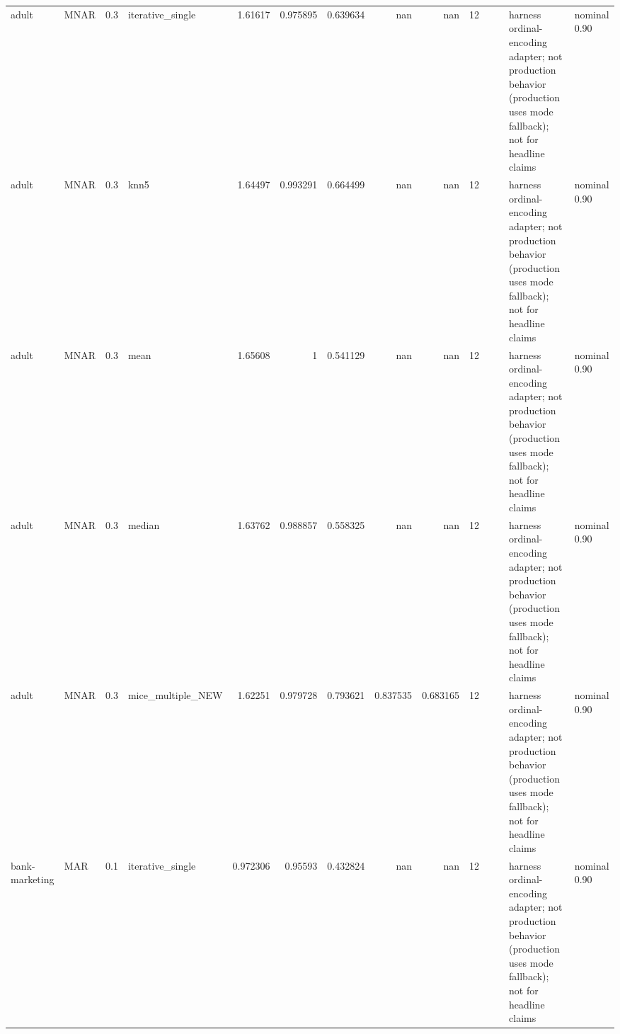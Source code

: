 \begin{table}[ht]
\begin{tabular}{llrlrrrrrrllll}
 adult                & MNAR        &         0.3 & iterative\_single  &       1.61617  &             0.975895 &                 0.639634 &                     nan        &                       nan        &        12 &                    &                                         & harness ordinal-encoding adapter; not production behavior (production uses mode fallback); not for headline claims & nominal 0.90              \\
 adult                & MNAR        &         0.3 & knn5              &       1.64497  &             0.993291 &                 0.664499 &                     nan        &                       nan        &        12 &                    &                                         & harness ordinal-encoding adapter; not production behavior (production uses mode fallback); not for headline claims & nominal 0.90              \\
 adult                & MNAR        &         0.3 & mean              &       1.65608  &             1        &                 0.541129 &                     nan        &                       nan        &        12 &                    &                                         & harness ordinal-encoding adapter; not production behavior (production uses mode fallback); not for headline claims & nominal 0.90              \\
 adult                & MNAR        &         0.3 & median            &       1.63762  &             0.988857 &                 0.558325 &                     nan        &                       nan        &        12 &                    &                                         & harness ordinal-encoding adapter; not production behavior (production uses mode fallback); not for headline claims & nominal 0.90              \\
 adult                & MNAR        &         0.3 & mice\_multiple\_NEW &       1.62251  &             0.979728 &                 0.793621 &                       0.837535 &                         0.683165 &        12 &                    &                                         & harness ordinal-encoding adapter; not production behavior (production uses mode fallback); not for headline claims & nominal 0.90              \\
 bank-marketing       & MAR         &         0.1 & iterative\_single  &       0.972306 &             0.95593  &                 0.432824 &                     nan        &                       nan        &        12 &                    &                                         & harness ordinal-encoding adapter; not production behavior (production uses mode fallback); not for headline claims & nominal 0.90              \\

\end{tabular}
\end{table}
